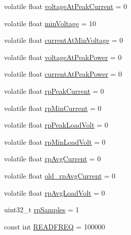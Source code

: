 \begin{DoxyCompactItemize}
\item 
volatile float \hyperlink{_u_s_b___tester___o_l_e_d__128x64___beta__2_82_8ino_adb3eab71f9d82f67a4dd817bc2814546}{voltage\+At\+Peak\+Current} = 0
\item 
volatile float \hyperlink{_u_s_b___tester___o_l_e_d__128x64___beta__2_82_8ino_aec96d529a560dc1d87df8bcfb3536022}{min\+Voltage} = 10
\item 
volatile float \hyperlink{_u_s_b___tester___o_l_e_d__128x64___beta__2_82_8ino_a2a0997d252e648db9a357afda6046c5a}{current\+At\+Min\+Voltage} = 0
\item 
volatile float \hyperlink{_u_s_b___tester___o_l_e_d__128x64___beta__2_82_8ino_a5c74a41a3f3481d69be975d2f26d454a}{voltage\+At\+Peak\+Power} = 0
\item 
volatile float \hyperlink{_u_s_b___tester___o_l_e_d__128x64___beta__2_82_8ino_a6b192a96a434d09d82a6d303db75c9d7}{current\+At\+Peak\+Power} = 0
\item 
volatile float \hyperlink{_u_s_b___tester___o_l_e_d__128x64___beta__2_82_8ino_a8ec0b92a65dfc0b869a25ea2d2f08183}{rp\+Peak\+Current} = 0
\item 
volatile float \hyperlink{_u_s_b___tester___o_l_e_d__128x64___beta__2_82_8ino_a49fb9e571965ac3ca332f8ef8787b1e0}{rp\+Min\+Current} = 0
\item 
volatile float \hyperlink{_u_s_b___tester___o_l_e_d__128x64___beta__2_82_8ino_af18a07813e2e71f4ec1672a1dce585cb}{rp\+Peak\+Load\+Volt} = 0
\item 
volatile float \hyperlink{_u_s_b___tester___o_l_e_d__128x64___beta__2_82_8ino_a72045352f62e11b0a66ae672805c5ac3}{rp\+Min\+Load\+Volt} = 0
\item 
volatile float \hyperlink{_u_s_b___tester___o_l_e_d__128x64___beta__2_82_8ino_a33cb3f3b10d9a30a3f433c9f84ccd7a1}{rp\+Avg\+Current} = 0
\item 
volatile float \hyperlink{_u_s_b___tester___o_l_e_d__128x64___beta__2_82_8ino_a279728b251cde9f2daebb123753519af}{old\+\_\+rp\+Avg\+Current} = 0
\item 
volatile float \hyperlink{_u_s_b___tester___o_l_e_d__128x64___beta__2_82_8ino_ad533d8748d6b89afc3836c72c9dafe37}{rp\+Avg\+Load\+Volt} = 0
\item 
uint32\+\_\+t \hyperlink{_u_s_b___tester___o_l_e_d__128x64___beta__2_82_8ino_a6783b54d0be7744f9ee0fef229f62006}{rp\+Samples} = 1
\item 
const int \hyperlink{_u_s_b___tester___o_l_e_d__128x64___beta__2_82_8ino_a4880a3cde916b594125eaa66cc6b391e}{R\+E\+A\+D\+F\+R\+EQ} = 100000
\item 

\end{DoxyCompactItemize}
